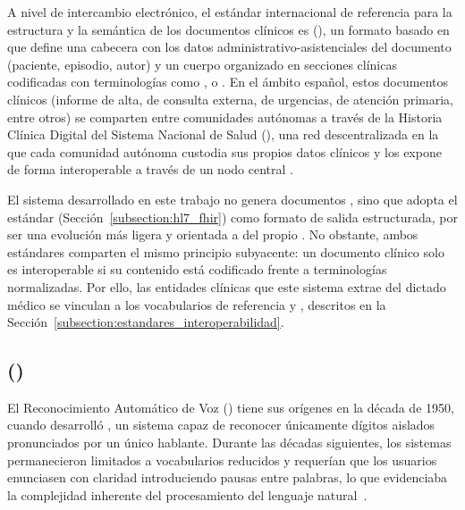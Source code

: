 A nivel de intercambio electrónico, el estándar internacional de referencia para la estructura y
la semántica de los documentos clínicos es 
(), un formato basado en  que define una
cabecera con los datos
administrativo-asistenciales del documento (paciente, episodio, autor) y un cuerpo organizado en
secciones clínicas codificadas con terminologías como , 
o  . En el ámbito español, estos documentos clínicos
(informe de alta, de consulta externa, de urgencias, de atención primaria, entre otros) se
comparten entre comunidades autónomas a través de la Historia Clínica Digital del Sistema Nacional
de Salud (), una red descentralizada en la que cada comunidad autónoma custodia
sus propios datos clínicos y los expone de forma interoperable a través de un nodo central
.

El sistema desarrollado en este trabajo no genera documentos , sino que
adopta el estándar  (Sección~\ref{subsection:hl7_fhir}) como formato de salida
estructurada, por ser una evolución más ligera y orientada a  del propio .
No obstante, ambos estándares comparten el mismo principio subyacente: un documento clínico solo es
interoperable si su contenido está codificado frente a terminologías normalizadas. Por ello, las
entidades clínicas que este sistema extrae del dictado médico se vinculan a los vocabularios de
referencia  y , descritos en la
Sección~\ref{subsection:estandares_interoperabilidad}.

\subsection{ ()}

El Reconocimiento Automático de Voz () tiene sus orígenes en la década de 1950, cuando 
 desarrolló , un sistema capaz de reconocer únicamente dígitos aislados 
pronunciados por un único hablante. 
Durante las décadas siguientes, los sistemas  permanecieron limitados a vocabularios reducidos y requerían
que los usuarios enunciasen con claridad introduciendo pausas entre palabras, lo que evidenciaba la complejidad inherente
del procesamiento del lenguaje natural~.

